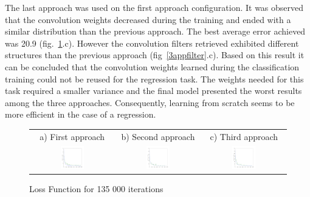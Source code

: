 The last approach was used on the first approach configuration. It was observed that the convolution weights decreased during the training and ended with a similar distribution than the previous approach. The best average error achieved was 20.9 (fig.~\ref{3apploss}.c). However the convolution filters retrieved exhibited different structures than the previous approach (fig~\ref{3appfilter}.c). Based on this result it can be concluded that the convolution weights learned during the classification training could not be reused for the regression task. The weights needed for this task required a smaller variance and the final model presented the worst results among the three approaches. Consequently, learning from scratch seems to be more efficient in the case of a regression.



\begin{figure}[htb]
\centering
\begin{tabular}{ccc}
    a) First approach & b) Second approach & c) Third approach \\
    \includegraphics[width=0.3\textwidth]{images/regression/test_loss_26_135000}&
    \includegraphics[width=0.3\textwidth]{images/regression/test_loss_37_135000}&
    \includegraphics[width=0.3\textwidth]{images/regression/test_loss_30_135000}\\
\end{tabular}
\caption{Loss Function for 135 000 iterations}
\label{1apploss}
\label{2apploss}
\label{3apploss}
\end{figure}

